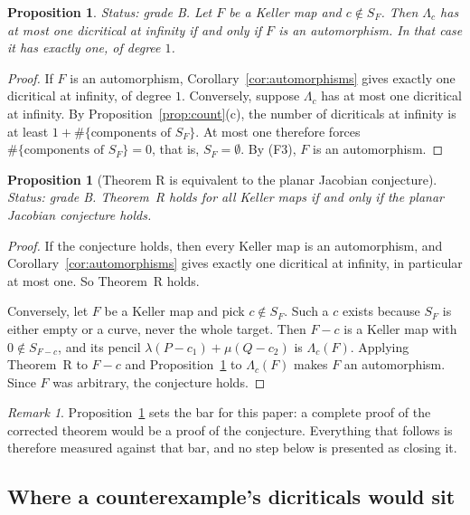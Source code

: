 \documentclass[a4paper,11pt]{article}
\theoremstyle{plain}
\newtheorem{proposition}[theorem]{Proposition}
\theoremstyle{definition}
\theoremstyle{remark}
\newtheorem{remark}[theorem]{Remark}
\begin{document}
\begin{proposition}\label{prop:onedic}
\textit{Status: grade B.}
Let $F$ be a Keller map and $c \notin S_F$. Then $\Lambda_c$ has at most one dicritical at
infinity if and only if $F$ is an automorphism. In that case it has exactly one, of degree $1$.
\end{proposition}

\begin{proof}
If $F$ is an automorphism, Corollary~\ref{cor:automorphisms} gives exactly one dicritical at
infinity, of degree $1$. Conversely, suppose $\Lambda_c$ has at most one dicritical at
infinity. By Proposition~\ref{prop:count}(c), the number of dicriticals at infinity is at
least $1 + \#\{\text{components of } S_F\}$. At most one therefore forces
$\#\{\text{components of } S_F\} = 0$, that is, $S_F = \emptyset$. By (F3), $F$ is an
automorphism.
\end{proof}

\begin{proposition}[Theorem R is equivalent to the planar Jacobian conjecture]\label{prop:equiv}
\textit{Status: grade B.}
Theorem~R holds for all Keller maps if and only if the planar Jacobian conjecture holds.
\end{proposition}

\begin{proof}
If the conjecture holds, then every Keller map is an automorphism, and
Corollary~\ref{cor:automorphisms} gives exactly one dicritical at infinity, in particular at
most one. So Theorem~R holds.

Conversely, let $F$ be a Keller map and pick $c \notin S_F$. Such a $c$ exists because $S_F$
is either empty or a curve, never the whole target. Then $F - c$ is a Keller map with
$0 \notin S_{F-c}$, and its pencil $\lambda (P - c_1) + \mu (Q - c_2)$ is $\Lambda_c(F)$.
Applying Theorem~R to $F - c$ and Proposition~\ref{prop:onedic} to $\Lambda_c(F)$ makes $F$
an automorphism. Since $F$ was arbitrary, the conjecture holds.
\end{proof}

\begin{remark}
Proposition~\ref{prop:equiv} sets the bar for this paper: a complete proof of the corrected
theorem would be a proof of the conjecture. Everything that follows is therefore measured
against that bar, and no step below is presented as closing it.
\end{remark}

\subsection{Where a counterexample's dicriticals would sit}\label{sec:where}
\end{document}
